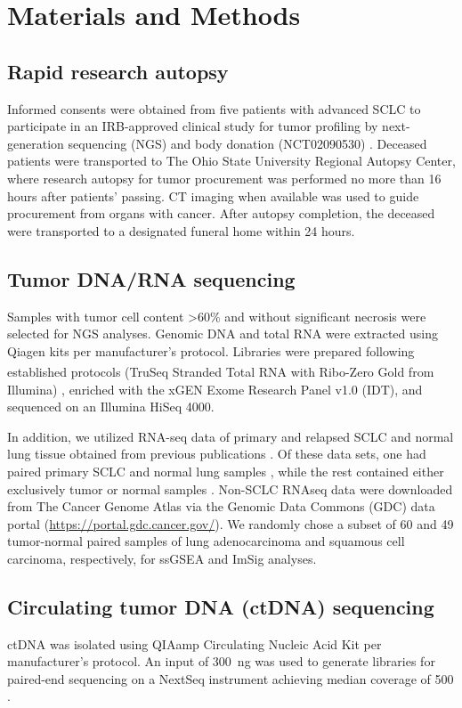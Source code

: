 \section{Materials and Methods}
\subsection{Rapid research autopsy}
Informed consents were obtained from five patients with advanced SCLC to participate in an IRB-approved clinical study for tumor profiling by next-generation sequencing (NGS) and body donation (NCT02090530) \cite{krook2019_review,krook2019_mcs}. Deceased patients were transported to The Ohio State University Regional Autopsy Center, where research autopsy for tumor procurement was performed no more than 16 hours after patients' passing. CT imaging when available was used to guide procurement from organs with cancer. After autopsy completion, the deceased were transported to a designated funeral home within 24 hours.

\subsection{Tumor DNA/RNA sequencing}
Samples with tumor cell content \textgreater{}60\% and without significant necrosis were selected for NGS analyses. Genomic DNA and total RNA were extracted using Qiagen kits per manufacturer's protocol. Libraries were prepared following established protocols (TruSeq Stranded Total RNA with Ribo-Zero Gold\textsuperscript\textregistered{} from Illumina) \cite{krook2019_mcs,reeser2017}, enriched with the xGEN Exome Research Panel v1.0 (IDT), and sequenced on an Illumina HiSeq 4000.

In addition, we utilized RNA-seq data of primary and relapsed SCLC and normal lung tissue obtained from previous publications \cite{rudin2012,wagner2018,weiss2017,fagerberg2014}. Of these data sets, one had paired primary SCLC and normal lung samples \cite{rudin2012}, while the rest contained either exclusively tumor \cite{wagner2018,weiss2017} or normal samples \cite{fagerberg2014}. Non-SCLC RNAseq data \cite{tcgaluad,tcgalusc} were downloaded from The Cancer Genome Atlas via the Genomic Data Commons (GDC) data portal (\url{https://portal.gdc.cancer.gov/}). We randomly chose a subset of 60 and 49 tumor-normal paired samples of lung adenocarcinoma and squamous cell carcinoma, respectively, for ssGSEA and ImSig analyses.

\subsection[ctDNA sequencing]{Circulating tumor DNA (ctDNA) sequencing}
ctDNA was isolated using QIAamp Circulating Nucleic Acid Kit per manufacturer's protocol. An input of 300~ng was used to generate libraries for paired-end sequencing on a NextSeq instrument achieving median coverage of \textapprox{}500\texttimes{} \cite{griffith2015}.

